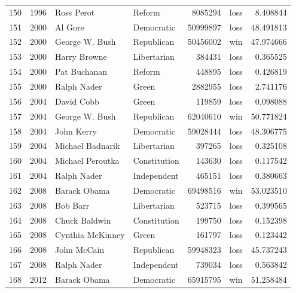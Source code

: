 \documentclass[
  letterpaper,
  DIV=11,
  numbers=noendperiod]{scrreprt}
\begin{document}
\begin{tabular}{lrllrlr}
150 &  1996 &              Ross Perot &                 Reform &       8085294 &   loss &   8.408844 \\
151 &  2000 &                 Al Gore &             Democratic &      50999897 &   loss &  48.491813 \\
152 &  2000 &          George W. Bush &             Republican &      50456002 &    win &  47.974666 \\
153 &  2000 &            Harry Browne &            Libertarian &        384431 &   loss &   0.365525 \\
154 &  2000 &            Pat Buchanan &                 Reform &        448895 &   loss &   0.426819 \\
155 &  2000 &             Ralph Nader &                  Green &       2882955 &   loss &   2.741176 \\
156 &  2004 &              David Cobb &                  Green &        119859 &   loss &   0.098088 \\
157 &  2004 &          George W. Bush &             Republican &      62040610 &    win &  50.771824 \\
158 &  2004 &              John Kerry &             Democratic &      59028444 &   loss &  48.306775 \\
159 &  2004 &        Michael Badnarik &            Libertarian &        397265 &   loss &   0.325108 \\
160 &  2004 &        Michael Peroutka &           Constitution &        143630 &   loss &   0.117542 \\
161 &  2004 &             Ralph Nader &            Independent &        465151 &   loss &   0.380663 \\
162 &  2008 &            Barack Obama &             Democratic &      69498516 &    win &  53.023510 \\
163 &  2008 &                Bob Barr &            Libertarian &        523715 &   loss &   0.399565 \\
164 &  2008 &           Chuck Baldwin &           Constitution &        199750 &   loss &   0.152398 \\
165 &  2008 &        Cynthia McKinney &                  Green &        161797 &   loss &   0.123442 \\
166 &  2008 &             John McCain &             Republican &      59948323 &   loss &  45.737243 \\
167 &  2008 &             Ralph Nader &            Independent &        739034 &   loss &   0.563842 \\
168 &  2012 &            Barack Obama &             Democratic &      65915795 &    win &  51.258484 \\

\end{tabular}
\end{document}
